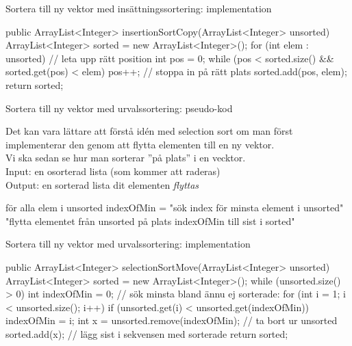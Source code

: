 \documentclass{lecturenotes}
\begin{document}
\begin{Slide}{Sortera till ny vektor med insättningssortering: implementation}
\begin{Code}
public ArrayList<Integer> insertionSortCopy(ArrayList<Integer> unsorted) {
    ArrayList<Integer> sorted = new ArrayList<Integer>();
    for (int elem : unsorted) {
        // leta upp rätt position 
        int pos = 0;  
        while (pos < sorted.size() && sorted.get(pos) < elem) {
            pos++;
        }
        // stoppa in på rätt plats
        sorted.add(pos, elem);
    }
    return sorted;
}
\end{Code}
\end{Slide}

\begin{Slide}{Sortera till ny vektor med urvalssortering: pseudo-kod}

{\footnotesize Det kan vara lättare att förstå idén med selection sort om man först implementerar den genom att flytta elementen till en ny vektor. \\ Vi ska sedan se hur man sorterar ''på plats''  i en vecktor.\\} \vspace{1em}
Input: en osorterad lista  (som kommer att raderas)\\
Output: en sorterad lista  dit elementen \emph{flyttas}
\begin{Code}
för alla elem i unsorted {
   indexOfMin = "sök index för minsta element i unsorted"
   "flytta elementet från unsorted på plats indexOfMin till sist i sorted" 
}
\end{Code}
\end{Slide}

\begin{Slide}{Sortera till ny vektor med urvalssortering: implementation}
\begin{Code}
public ArrayList<Integer> selectionSortMove(ArrayList<Integer> unsorted) {
    ArrayList<Integer> sorted = new ArrayList<Integer>();
    while (unsorted.size() > 0) {
        int indexOfMin = 0;
        // sök minsta bland ännu ej sorterade:
        for (int i = 1; i < unsorted.size(); i++) { 
            if (unsorted.get(i) < unsorted.get(indexOfMin)) {
                indexOfMin = i;
            }
        }
        int x = unsorted.remove(indexOfMin);  // ta bort ur unsorted
        sorted.add(x);  // lägg sist i sekvensen med sorterade
    }
    return sorted;
}
\end{Code}
\end{Slide}
\end{document}
